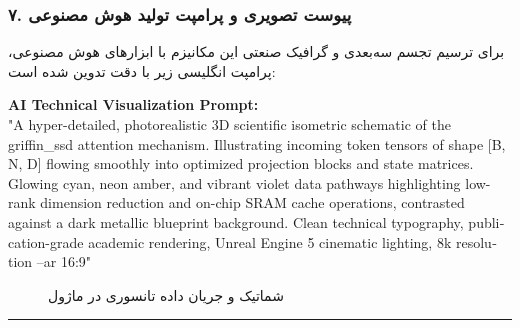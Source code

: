 \subsubsection*{۷. پیوست تصویری و پرامپت تولید هوش مصنوعی}
برای ترسیم تجسم سه‌بعدی و گرافیک صنعتی این مکانیزم با ابزارهای هوش مصنوعی، پرامپت انگلیسی زیر با دقت تدوین شده است:

\vspace{0.2cm}
\begin{latin}
\footnotesize
\textbf{AI Technical Visualization Prompt:}\\
"A hyper-detailed, photorealistic 3D scientific isometric schematic of the griffin\_ssd attention mechanism. Illustrating incoming token tensors of shape [B, N, D] flowing smoothly into optimized projection blocks and state matrices. Glowing cyan, neon amber, and vibrant violet data pathways highlighting low-rank dimension reduction and on-chip SRAM cache operations, contrasted against a dark metallic blueprint background. Clean technical typography, publication-grade academic rendering, Unreal Engine 5 cinematic lighting, 8k resolution --ar 16:9"
\end{latin}

\begin{figure}[H]
    \centering
    \caption{شماتیک و جریان داده تانسوری در ماژول }
    \label{fig:griffin_ssd}
\end{figure}

\vspace{0.5cm}
\hrule
\vspace{0.5cm}

